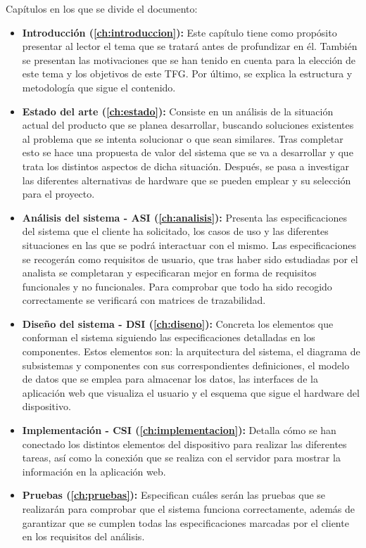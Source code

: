 Capítulos en los que se divide el documento:

\begin{itemize}
	\item \textbf{Introducción (\autoref{ch:introduccion}):} Este capítulo tiene como propósito presentar al lector el tema que se tratará antes de profundizar en él. También se presentan las motivaciones que se han tenido en cuenta para la elección de este tema y los objetivos de este TFG. Por último, se explica la estructura y metodología que sigue el contenido.
	\item \textbf{Estado del arte (\autoref{ch:estado}):} Consiste en un análisis de la situación actual del producto que se planea desarrollar, buscando soluciones existentes al problema que se intenta solucionar o que sean similares. Tras completar esto se hace una propuesta de valor del sistema que se va a desarrollar y que trata los distintos aspectos de dicha situación. Después, se pasa a investigar las diferentes alternativas de hardware que se pueden emplear y su selección para el proyecto.
	\item \textbf{Análisis del sistema - ASI (\autoref{ch:analisis}):} Presenta las especificaciones del sistema que el cliente ha solicitado, los casos de uso y las diferentes situaciones en las que se podrá interactuar con el mismo. Las especificaciones se recogerán como requisitos de usuario, que tras haber sido estudiadas por el analista se completaran y especificaran mejor en forma de requisitos funcionales y no funcionales. Para comprobar que todo ha sido recogido correctamente se verificará con matrices de trazabilidad.
	\item \textbf{Diseño del sistema - DSI (\autoref{ch:diseno}):} Concreta los elementos que conforman el sistema siguiendo las especificaciones detalladas en los componentes. Estos elementos son: la arquitectura del sistema, el diagrama de subsistemas y componentes con sus correspondientes definiciones, el modelo de datos que se emplea para almacenar los datos, las interfaces de la aplicación web que visualiza el usuario y el esquema que sigue el hardware del dispositivo.
	\item \textbf{Implementación - CSI (\autoref{ch:implementacion}):} Detalla cómo se han conectado los distintos elementos del dispositivo para realizar las diferentes tareas, así como la conexión que se realiza con el servidor para mostrar la información en la aplicación web.
	\item \textbf{Pruebas (\autoref{ch:pruebas}):} Especifican cuáles serán las pruebas que se realizarán para comprobar que el sistema funciona correctamente, además de garantizar que se cumplen todas las especificaciones marcadas por el cliente en los requisitos del análisis.

\end{itemize}
